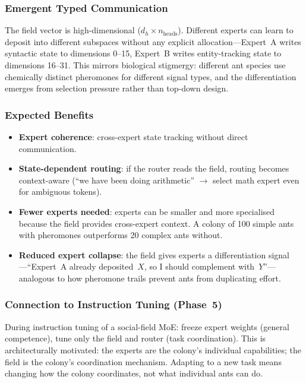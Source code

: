 \documentclass[11pt,a4paper]{article}
\begin{document}
\subsubsection{Emergent Typed Communication}

The field vector is high-dimensional ($d_h \times n_{\text{heads}}$).
Different experts can learn to deposit into different subspaces without
any explicit allocation---Expert~A writes syntactic state to dimensions
0--15, Expert~B writes entity-tracking state to dimensions 16--31.
This mirrors biological stigmergy: different ant species use chemically
distinct pheromones for different signal types, and the differentiation
emerges from selection pressure rather than top-down design.

\subsubsection{Expected Benefits}

\begin{itemize}
    \item \textbf{Expert coherence}: cross-expert state tracking
          without direct communication.
    \item \textbf{State-dependent routing}: if the router reads the
          field, routing becomes context-aware (``we have been doing
          arithmetic'' $\rightarrow$ select math expert even for
          ambiguous tokens).
    \item \textbf{Fewer experts needed}: experts can be smaller and
          more specialised because the field provides cross-expert
          context.  A colony of 100 simple ants with pheromones
          outperforms 20 complex ants without.
    \item \textbf{Reduced expert collapse}: the field gives experts a
          differentiation signal---``Expert~A already deposited~$X$,
          so I should complement with~$Y$''---analogous to how
          pheromone trails prevent ants from duplicating effort.
\end{itemize}

\subsubsection{Connection to Instruction Tuning (Phase~5)}

During instruction tuning of a social-field MoE: freeze expert weights
(general competence), tune only the field and router (task
coordination).  This is architecturally motivated: the experts are
the colony's individual capabilities; the field is the colony's
coordination mechanism.  Adapting to a new task means changing how
the colony coordinates, not what individual ants can do.
\end{document}
